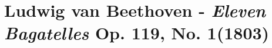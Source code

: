 \chapter[Beethoven and Eleven Bagatelles, Op. 119, No. 1]{Ludwig van Beethoven - \textit{Eleven Bagatelles} Op. 119, No. 1(1803)}\label{beethoven}